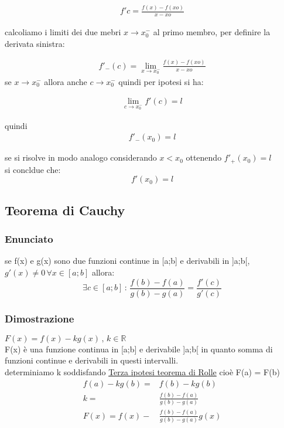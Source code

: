 \documentclass[a4paper,11pt]{article}
\begin{document}
\begin{align*}
    f'c = \frac{f(x)- f(xo)}{x-xo}
\end{align*}

calcoliamo i limiti dei due mebri \( x \to x_0^- \) al primo membro, per definire la derivata sinistra:


\begin{align*}
     f'_-(c) = \lim_{x \to x_0^-}  \frac{f(x)- f(xo)}{x-xo}
\end{align*}
se \( x \to x_0^- \) allora anche \( c \to x_0^- \) quindi per ipotesi si ha:

\begin{align*}
\lim_{c \to x_0^-} f'(c) = l
\end{align*}

quindi 
\begin{align*}
     f'_-(x_0) = l
    \end{align*}

se si risolve in modo analogo considerando \(x < x_0\) ottenendo  \(f'_+(x_0) = l\) 
\\
si concldue che:
\[
    f'(x_0) = l
\]



\subsection{Teorema di Cauchy}
\label{sec:Cauchy}


\subsubsection{Enunciato}
se f(x) e g(x) sono due funzioni continue in [a;b] e derivabili in ]a;b[, \( g'(x) \neq 0 \, \forall x \in [a;b] \) allora:
\[
   \exists c \in [a;b] \, : \, \frac{f(b) - f(a)}{g(b) - g(a)} = \frac{f'(c)}{g'(c)}
\]

\subsubsection{Dimostrazione}

\( F(x) = f(x) - kg(x) \, , \, k \in \mathbb{R} \) \\
F(x) è una funzione continua in [a;b] e derivabile ]a;b[ in quanto somma di funzioni continue e derivabili in questi intervalli. \\
determiniamo k soddisfando \hyperref[sec:3Rolle]{Terza ipotesi teorema di Rolle} cioè F(a) = F(b)
\begin{align*}
f(a) - kg(b) =& f(b) - kg(b)
\\
k =& \frac{f(b) - f(a)}{g(b) - g(a)}    
\\
F(x) = f(x) -& \frac{f(b) - f(a)}{g(b) - g(a)} g(x) 
\end{align*}
\end{document}
